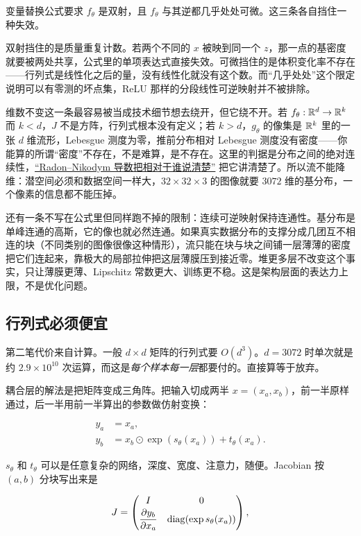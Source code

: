 变量替换公式要求 \(f_\theta\) 是双射，且 \(f_\theta\) 与其逆都几乎处处可微。这三条各自挡住一种失效。

双射挡住的是质量重复计数。若两个不同的 \(x\) 被映到同一个 \(z\)，那一点的基密度就要被两处共享，公式里的单项表达式直接失效。可微挡住的是体积变化率不存在——行列式是线性化之后的量，没有线性化就没有这个数。而``几乎处处''这个限定说明可以有零测的坏点集，ReLU 那样的分段线性可逆映射并不被排除。

维数不变这一条最容易被当成技术细节想去绕开，但它绕不开。若 \(f_\theta:\mathbb{R}^d\to\mathbb{R}^k\) 而 \(k<d\)，\(J\) 不是方阵，行列式根本没有定义；若 \(k>d\)，\(g_\theta\) 的像集是 \(\mathbb{R}^k\) 里的一张 \(d\) 维流形，Lebesgue 测度为零，推前分布相对 Lebesgue 测度没有密度——你能算的所谓``密度''不存在，不是难算，是不存在。这里的判据是分布之间的绝对连续性，\hyperref[sec:12-Real-Analysis-Support/05-Measure-Integration-and-Conditional-Expectation/04]{``Radon--Nikodym 导数把相对于谁说清楚''} 把它讲清楚了。所以流不能降维：潜空间必须和数据空间一样大，\(32\times32\times3\) 的图像就要 \(3072\) 维的基分布，一个像素的信息都不能压掉。

还有一条不写在公式里但同样跑不掉的限制：连续可逆映射保持连通性。基分布是单峰连通的高斯，它的像也就必然连通。如果真实数据分布的支撑分成几团互不相连的块（不同类别的图像很像这种情形），流只能在块与块之间铺一层薄薄的密度把它们连起来，靠极大的局部拉伸把这层薄膜压到接近零。堆更多层不改变这个事实，只让薄膜更薄、Lipschitz 常数更大、训练更不稳。这是架构层面的表达力上限，不是优化问题。

\subsection{行列式必须便宜}

第二笔代价来自计算。一般 \(d\times d\) 矩阵的行列式要 \(O(d^3)\)。\(d=3072\) 时单次就是约 \(2.9\times10^{10}\) 次运算，而这是\emph{每个样本每一层}都要付的。直接算等于放弃。

耦合层的解法是把矩阵变成三角阵。把输入切成两半 \(x=(x_a,x_b)\)，前一半原样通过，后一半用前一半算出的参数做仿射变换：

\[
\begin{aligned}
y_a&=x_a,\\
y_b&=x_b\odot\exp\!\left(s_\theta(x_a)\right)+t_\theta(x_a).
\end{aligned}
\]

\(s_\theta\) 和 \(t_\theta\) 可以是任意复杂的网络，深度、宽度、注意力，随便。Jacobian 按 \((a,b)\) 分块写出来是

\[
J=\begin{pmatrix} I & 0\\[2pt] \dfrac{\partial y_b}{\partial x_a} & \operatorname{diag}\!\left(\exp s_\theta(x_a)\right)\end{pmatrix},
\]

